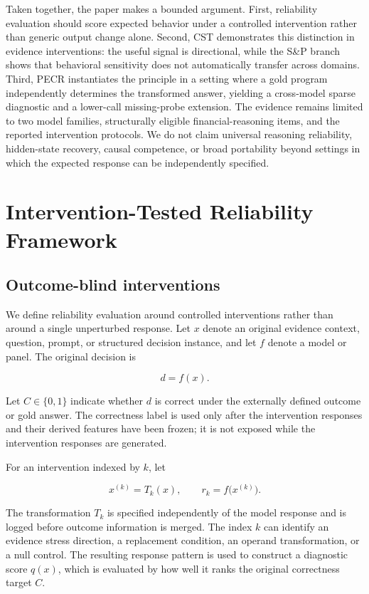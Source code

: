 \documentclass[11pt]{article}
\begin{document}
Taken together, the paper makes a bounded argument. First, reliability evaluation should score expected behavior under a controlled intervention rather than generic output change alone. Second, CST demonstrates this distinction in evidence interventions: the useful signal is directional, while the S\&P branch shows that behavioral sensitivity does not automatically transfer across domains. Third, PECR instantiates the principle in a setting where a gold program independently determines the transformed answer, yielding a cross-model sparse diagnostic and a lower-call missing-probe extension. The evidence remains limited to two model families, structurally eligible financial-reasoning items, and the reported intervention protocols. We do not claim universal reasoning reliability, hidden-state recovery, causal competence, or broad portability beyond settings in which the expected response can be independently specified.

\section{Intervention-Tested Reliability Framework}

\subsection{Outcome-blind interventions}

We define reliability evaluation around controlled interventions rather than around a single unperturbed response. Let \(x\) denote an original evidence context, question, prompt, or structured decision instance, and let \(f\) denote a model or panel. The original decision is

\[
d=f(x).
\]

Let \(C\in\{0,1\}\) indicate whether \(d\) is correct under the externally defined outcome or gold answer. The correctness label is used only after the intervention responses and their derived features have been frozen; it is not exposed while the intervention responses are generated.

For an intervention indexed by \(k\), let

\[
x^{(k)}=T_k(x), \qquad r_k=f\bigl(x^{(k)}\bigr).
\]

The transformation \(T_k\) is specified independently of the model response and is logged before outcome information is merged. The index \(k\) can identify an evidence stress direction, a replacement condition, an operand transformation, or a null control. The resulting response pattern is used to construct a diagnostic score \(q(x)\), which is evaluated by how well it ranks the original correctness target \(C\).
\end{document}

